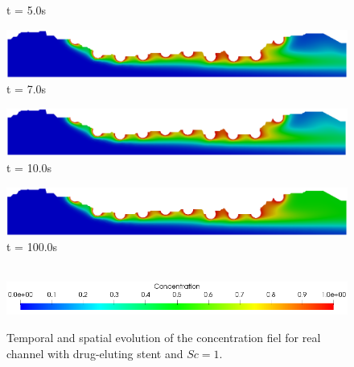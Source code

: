 \begin{figure}[H]
\begin{minipage}{.50\linewidth}
      t = 5.0s
     \end{minipage}%
     \begin{minipage}{.50\linewidth}
      \centering
      \includegraphics[scale=0.18]{./02_chaps/cap_solution/figure/conc1_RealStrut6.png}\\
      t = 7.0s
     \end{minipage}
     \begin{minipage}{.50\linewidth}
     \medskip
      \centering
      \includegraphics[scale=0.18]{./02_chaps/cap_solution/figure/conc1_RealStrut7.png}\\
      t = 10.0s
     \end{minipage}%
     \begin{minipage}{.50\linewidth}
     \medskip
      \centering
      \includegraphics[scale=0.18]{./02_chaps/cap_solution/figure/conc1_RealStrut8.png}\\
      t = 100.0s
     \end{minipage}\\[10pt]
      \centering
      \includegraphics[scale=0.5]{./02_chaps/cap_solution/figure/conc1_RealStrutScale.png}\\
     \medskip
     \caption{
Temporal and spatial evolution of the concentration fiel for real channel with drug-eluting stent and $Sc=1$.}
     \label{conc field real stent sc 1}
\end{figure}



